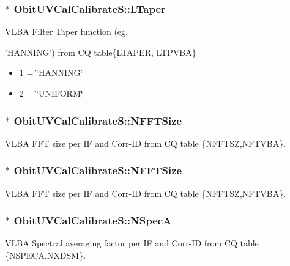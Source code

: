 \subsubsection{$\ast$ {\bf Obit\-UVCal\-Calibrate\-S::LTaper}}\label{structObitUVCalCalibrateS_o46}


VLBA Filter Taper function (eg. 

'HANNING') from CQ table\{LTAPER, LTPVBA\} \begin{itemize}
\item 1 = \char`\"{}HANNING\char`\"{} \item 2 = \char`\"{}UNIFORM\char`\"{} \end{itemize}
\subsubsection{$\ast$ {\bf Obit\-UVCal\-Calibrate\-S::NFFTSize}}\label{structObitUVCalCalibrateS_o76}


VLBA FFT size per IF and Corr-ID from CQ table \{NFFTSZ,NFTVBA\}. 

\subsubsection{$\ast$ {\bf Obit\-UVCal\-Calibrate\-S::NFFTSize}}\label{structObitUVCalCalibrateS_o49}


VLBA FFT size per IF and Corr-ID from CQ table \{NFFTSZ,NFTVBA\}. 

\subsubsection{$\ast$ {\bf Obit\-UVCal\-Calibrate\-S::NSpec\-A}}\label{structObitUVCalCalibrateS_o74}


VLBA Spectral averaging factor per IF and Corr-ID from CQ table \{NSPECA,NXDSM\}. 

